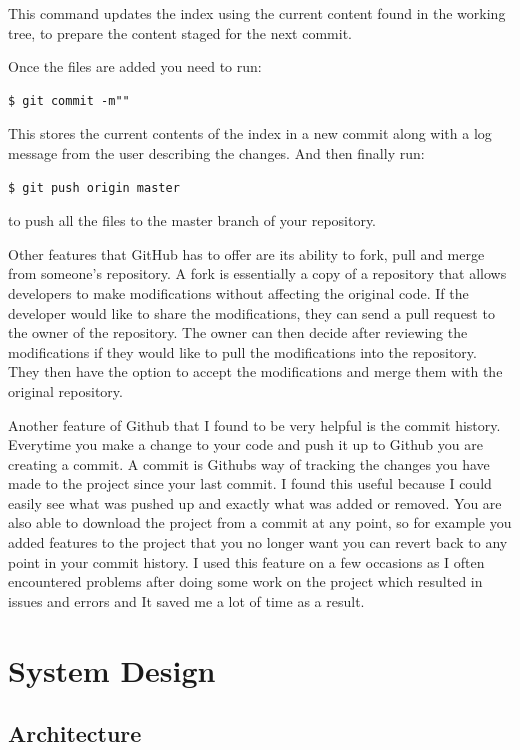 This command updates the index using the current content found in the working tree, to prepare the content staged for the next commit. 

Once the files are added you need to run:

\begin{verbatim}
$ git commit -m""
\end{verbatim}
This stores the current contents of the index in a new commit along with a log message from the user describing the changes. And then finally run:
\begin{verbatim}
$ git push origin master
\end{verbatim}
to push all the files to the master branch of your repository.

Other features that GitHub has to offer are its ability to fork, pull and merge from someone's repository. A fork is essentially a copy of a repository that allows developers to make modifications without affecting the original code.  If the developer would like to share the modifications, they can send a pull request to the owner of the repository. The owner can then decide after reviewing the modifications if they would like to pull the modifications into the repository. They then have the option to accept the modifications and merge them with the original repository.\cite{githubop}

Another feature of Github that I found to be very helpful is the commit history. Everytime you make a change to your code and push it up to Github you are creating a commit. A commit is Githubs way of tracking the changes you have made to the project since your last commit. I found this useful because I could easily see what was pushed up and exactly what was added or removed. You are also able to download the project from a commit at any point, so for example you added features to the project that you no longer want you can revert back to any point in your commit history. I used this feature on a few occasions as I often encountered problems after doing some work on the project which resulted in issues and errors and It saved me a lot of time as a result.


\chapter{System Design}
 \section{Architecture}

